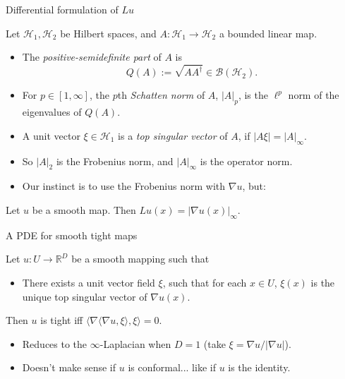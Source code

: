 \documentclass[10pt]{beamer}
\newcommand{\RR}{\mathbb{R}}
\begin{document}
\begin{frame}{Differential formulation of $Lu$}
\begin{definition}
Let $\mathcal H_1, \mathcal H_2$ be Hilbert spaces, and $A: \mathcal H_1 \to \mathcal H_2$ a bounded linear map. \pause
\begin{itemize}
\item The \emph{positive-semidefinite part} of $A$ is
$$Q(A) := \sqrt{AA^\dagger} \in \mathcal B(\mathcal H_2).$$
\item For $p \in [1, \infty]$, the $p$th \emph{Schatten norm} of $A$, $|A|_p$, is the $\ell^p$ norm of the eigenvalues of $Q(A)$.
\item A unit vector $\xi \in \mathcal H_1$ is a \emph{top singular vector} of $A$, if $|A\xi| = |A|_\infty$. \pause
\end{itemize}
\end{definition}

\begin{itemize}
\item So $|A|_2$ is the Frobenius norm, and $|A|_\infty$ is the operator norm. \pause
\item Our instinct is to use the Frobenius norm with $\nabla u$, but: \pause
\end{itemize}

\begin{lemma}
Let $u$ be a smooth map. Then $Lu(x) = |\nabla u(x)|_\infty$.
\end{lemma}

\end{frame}

\begin{frame}{A PDE for smooth tight maps}
\begin{theorem}
Let $u: U \to \RR^D$ be a smooth mapping such that
\begin{itemize}
\item There exists a unit vector field $\xi$, such that for each $x \in U$, $\xi(x)$ is the unique top singular vector of $\nabla u(x)$.
\end{itemize}
Then $u$ is tight iff $\langle \nabla \langle \nabla u, \xi\rangle, \xi\rangle = 0$. \pause
\end{theorem}

\begin{itemize}
\item Reduces to the $\infty$-Laplacian when $D = 1$ (take $\xi = \nabla u/|\nabla u|$). \pause
\item Doesn't make sense if $u$ is conformal... like if $u$ is the identity.
\end{itemize}
\end{frame}
\end{document}
